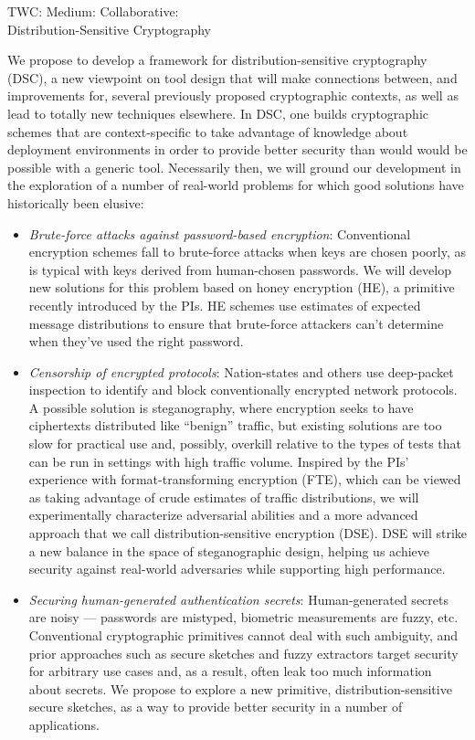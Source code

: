 \documentclass[11pt]{article}
\begin{document}
\thispagestyle{empty}

\begin{center}
{\Large TWC: Medium: Collaborative: }\\ 
{\Large Distribution-Sensitive Cryptography} 
\end{center}
\noindent

We propose to develop a framework for distribution-sensitive cryptography
(DSC), a new viewpoint on tool design that will make connections between, and
improvements for, several previously proposed cryptographic contexts, as well as
lead to totally new techniques elsewhere. In DSC, one builds cryptographic
schemes that are context-specific to take advantage of knowledge about 
deployment environments in order to provide better security than would would be
possible with a generic tool.  Necessarily then, we will ground our development
in the exploration of a number of real-world problems for which good solutions
have historically been elusive:
\begin{itemize}
\item \emph{Brute-force attacks against password-based encryption}: Conventional
encryption schemes fall to brute-force attacks when keys are chosen poorly, as
is typical with keys derived from human-chosen passwords. We will
develop new solutions for this problem based on
honey encryption (HE), a primitive recently introduced by the PIs. HE schemes
use estimates of expected message distributions to ensure that
brute-force attackers can't determine when they've used the right password.
%
\item \emph{Censorship of encrypted protocols}: Nation-states and others use
deep-packet inspection to identify and block conventionally encrypted
network protocols. A possible solution is steganography, where encryption seeks to have
ciphertexts distributed like ``benign'' traffic, but existing solutions are
too slow for practical use and, possibly, overkill relative to the types of
tests that can be run in settings with high traffic volume. Inspired by the
PIs' experience with format-transforming encryption (FTE), which can be viewed as
taking advantage of crude estimates of traffic distributions, 
we will experimentally characterize
adversarial abilities and a more advanced approach that we call
distribution-sensitive encryption (DSE).  DSE will strike a new
balance in the space of steganographic design, helping us achieve
security against real-world adversaries while supporting high performance. 
%
\item \emph{Securing human-generated authentication secrets}: Human-generated
secrets are noisy --- passwords are mistyped, biometric measurements are fuzzy,
etc. Conventional cryptographic primitives cannot deal with such ambiguity, and prior approaches
such as secure sketches and fuzzy extractors target security for arbitrary use
cases and, as a result, often leak too much information about secrets. 
We propose to explore a new primitive, distribution-sensitive secure sketches, 
as a way to provide better security in a number of applications.
\end{itemize}
\end{document}
